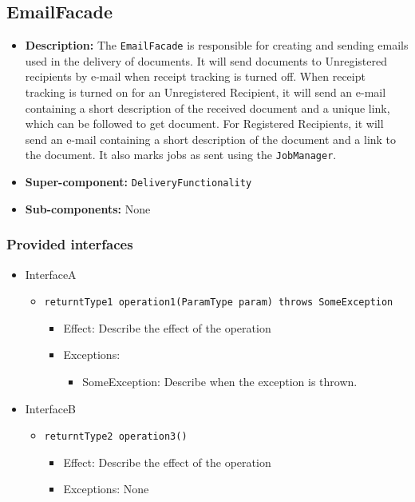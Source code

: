 \documentclass[a4paper,10pt]{article}
\begin{document}
\subsection{EmailFacade}
\begin{itemize}
    \item \textbf{Description:} The \texttt{EmailFacade} is responsible for creating and sending emails used in the delivery of documents. It will send documents to  Unregistered recipients by e-mail when receipt tracking is turned off. When receipt tracking is turned on for an Unregistered Recipient, it will send an e-mail containing a short description of the received document and a unique link, which can be followed to get document. For Registered Recipients, it will send an e-mail containing a short description of the document and a link to the document. It also marks jobs as sent using the \texttt{JobManager}.
    \item \textbf{Super-component:} \texttt{DeliveryFunctionality}
    \item \textbf{Sub-components:} None
\end{itemize}

\subsubsection*{Provided interfaces}
\begin{itemize}
    \item InterfaceA
    \begin{itemize}
        \item \texttt{returntType1 operation1(ParamType param) throws SomeException}
        \begin{itemize}
            \item Effect: Describe the effect of the operation
            \item Exceptions:
            \begin{itemize}
                \item SomeException: Describe when the exception is thrown.
            \end{itemize}
        \end{itemize}
    \end{itemize}

    \item InterfaceB
    \begin{itemize}
        \item \texttt{returntType2 operation3()}
        \begin{itemize}
            \item Effect: Describe the effect of the operation
            \item Exceptions: None
        \end{itemize}
    \end{itemize}
\end{itemize}
\end{document}
